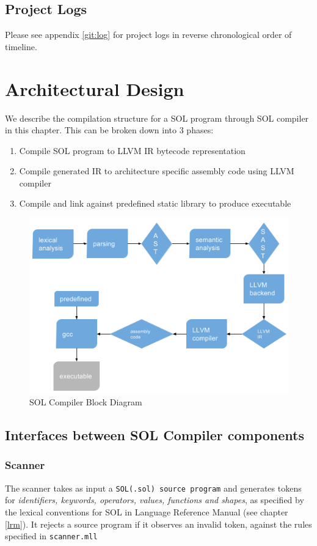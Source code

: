 \documentclass[letterpaper,12pt]{report}
\begin{document}
  \section {Project Logs}
  Please see appendix \ref{git:log} for project logs in reverse chronological order of timeline.

\chapter{Architectural Design}
  We describe the compilation structure for a SOL program through SOL compiler in this chapter. This can be broken down into 3 phases:
  \begin{enumerate}
    \itemsep 0em

    \item Compile SOL program to LLVM IR bytecode representation
    \item Compile generated IR to architecture specific assembly code using LLVM compiler
    \item Compile and link against predefined static library to produce executable
  \end{enumerate}

  \begin{figure}[ht]
    \includegraphics[scale=1]{compile-architecture.png}
    \caption{SOL Compiler Block Diagram}
  \end{figure}

  \section{Interfaces between SOL Compiler components}
    \subsection{Scanner}
      The scanner takes as input a \texttt{SOL(.sol) source program} and generates tokens for \textit{identifiers, keywords, operators, values, functions and shapes}, as specified by the lexical conventions for SOL in  Language Reference Manual (see chapter \ref{lrm}). It rejects a source program if it observes an invalid token, against the rules specified in \texttt{scanner.mll}
\end{document}
